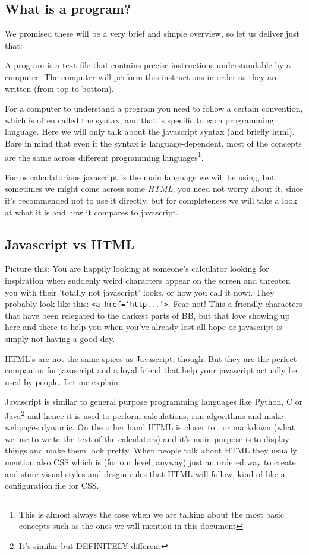 \subsection{What is a program?} 
\label{sub:program}
We promised these will be a very brief and simple overview, so let us deliver just that:

A program is a text file that contains precise instructions understandable by a computer. The computer will perform this instructions in order as they are written (from top to bottom). 

For a computer to understand a program you need to follow a certain convention, which is often called the syntax, and that is specific to each programming language. Here we will only talk about the javascript syntax (and briefly html). Bare in mind that even if the syntax is language-dependent, most of the concepts are the same across different programming languages\footnote{This is almost always the case when we are talking about the most basic concepts such as the ones we will mention in this document}.

For us calculatorians javascript is the main language we will be using, but sometimes we might come across some \textit{HTML}, you need not worry about it, since it's recommended not to use it directly, but for completeness we will take a look at what it is and how it compares to javascript.
\subsection{Javascript vs HTML}
\label{sub:jsHtml}
Picture this: You are happily looking at someone's calculator looking for inspiration when suddenly weird characters appear on the screen and threaten you with their 'totally not javascript' looks, or how you call it now:. They probably look like this: \texttt{<a href='http...'>}. Fear not! This a friendly characters that have been relegated to the darkest parts of BB, but that love showing up here and there to help you when you've already lost all hope or javascript is simply not having a good day. 

HTML's are not the same spices as Javascript, though. But they are the perfect companion for javascript and a loyal friend that help your javascript actually be used by people. Let me explain:

Javascript is similar to general purpose programming languages like Python, C or Java\footnote{It's similar but DEFINITELY different} and hence it is used to perform calculations, run algorithms and make webpages dynamic. On the other hand HTML is closer to \latex, or markdown (what we use to write the text of the calculators) and it's main purpose is to display things and make them look pretty. When people talk about HTML they usually mention also CSS which is (for our level, anyway) just an ordered way to create and store visual styles and desgin rules that HTML will follow, kind of like a configuration file for CSS.

